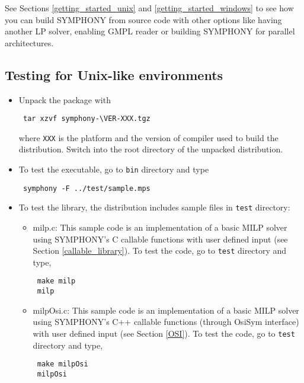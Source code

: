 See Sections \ref{getting_started_unix} and \ref{getting_started_windows} 
to see how you can build SYMPHONY from source code with other options like 
having another LP solver, enabling GMPL reader or building SYMPHONY for 
parallel architectures. 

\subsection{Testing for Unix-like environments}
\begin{itemize}
\item Unpack the package with
{\color{Brown}
\begin{verbatim}
 tar xzvf symphony-\VER-XXX.tgz
\end{verbatim}
}
where \texttt{XXX} is the platform and the version of 
compiler used to build the distribution. 
Switch into the root directory of the unpacked distribution. 

\item To test the executable, go to \texttt{bin} directory and type
{\color{Brown}
\begin{verbatim}
 symphony -F ../test/sample.mps
\end{verbatim}
}
\item To test the library, the distribution
includes sample files in \texttt{test} directory:  
\begin{itemize}
\item milp.c: This sample code is an implementation of a basic MILP solver 
using SYMPHONY's C callable functions with user defined input 
(see Section \ref{callable_library}). 
To test the code, go to \texttt{test} directory and type, 
{\color{Brown}
\begin{verbatim}
 make milp 
 milp
 \end{verbatim}
}
\item milpOsi.c: This sample code is an implementation of a basic MILP 
solver using SYMPHONY's C++ callable functions (through OsiSym interface)
with user defined input (see Section \ref{OSI}). To test the code, 
go to \texttt{test} directory and type, 
{\color{Brown}
\begin{verbatim}
 make milpOsi
 milpOsi
 \end{verbatim}
}
\end{itemize}
\end{itemize}
